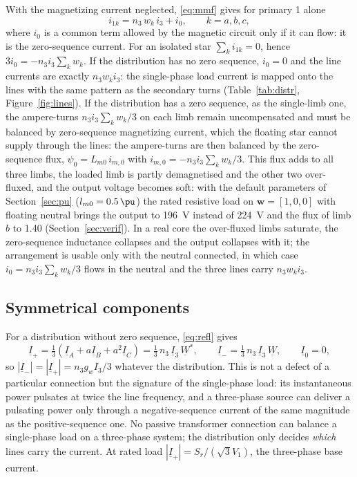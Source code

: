 \documentclass[10pt,a4paper]{scrartcl}
\newcommand{\ph}[1]{\underline{#1}}
\newcommand{\vect}[1]{\boldsymbol{#1}}
\begin{document}
\begin{onehalfspace}
With the magnetizing current neglected, \eqref{eq:mmf} gives for primary 1 alone
\begin{equation}
i_{1k} = n_3\,w_k\,i_3 + i_{0}, \qquad k=a,b,c ,
\label{eq:refl}
\end{equation}
where $i_0$ is a common term allowed by the magnetic circuit only if it can flow: it is the zero-sequence current. For an isolated star $\sum_k i_{1k}=0$, hence $3i_0 = -n_3 i_3\sum_k w_k$. If the distribution has no zero sequence, $i_0=0$ and the line currents are exactly $n_3 w_k i_3$: the single-phase load current is mapped onto the lines with the same pattern as the secondary turns (Table~\ref{tab:distr}, Figure~\ref{fig:lines}). If the distribution has a zero sequence, as the single-limb one, the ampere-turns $n_3 i_3 \sum_k w_k/3$ on each limb remain uncompensated and must be balanced by zero-sequence magnetizing current, which the floating star cannot supply through the lines: the ampere-turns are then balanced by the zero-sequence flux, $\psi_0 = L_{m0}\,i_{m,0}$ with $i_{m,0} = -n_3 i_3\sum_k w_k/3$. This flux adds to all three limbs, the loaded limb is partly demagnetised and the other two over-fluxed, and the output voltage becomes soft: with the default parameters of Section~\ref{sec:pu} ($l_{m0}=\SI{0.5}{\pu}$) the rated resistive load on $\vect{w}=[1,0,0]$ with floating neutral brings the output to \SI{196}{V} instead of \SI{224}{V} and the flux of limb $b$ to \SI{1.40}{\pu} (Section~\ref{sec:verif}). In a real core the over-fluxed limbs saturate, the zero-sequence inductance collapses and the output collapses with it; the arrangement is usable only with the neutral connected, in which case $i_0 = n_3 i_3\sum_k w_k/3$ flows in the neutral and the three lines carry $n_3 w_k i_3$.

\subsection{Symmetrical components}

For a distribution without zero sequence, \eqref{eq:refl} gives
\begin{equation}
\ph{I}_+ = \tfrac13\left(\ph{I}_A + a\ph{I}_B + a^2\ph{I}_C\right) = \tfrac13\,n_3\,\ph{I}_3\,\ph{W}^{*}, \qquad
\ph{I}_- = \tfrac13\,n_3\,\ph{I}_3\,\ph{W}, \qquad \ph{I}_0 = 0 ,
\label{eq:seq}
\end{equation}
so $|\ph{I}_-| = |\ph{I}_+| = n_3 g_w I_3/3$ whatever the distribution. This is not a defect of a particular connection but the signature of the single-phase load: its instantaneous power pulsates at twice the line frequency, and a three-phase source can deliver a pulsating power only through a negative-sequence current of the same magnitude as the positive-sequence one. No passive transformer connection can balance a single-phase load on a three-phase system; the distribution only decides \emph{which} lines carry the current. At rated load $|\ph{I}_+| = S_r/(\sqrt3 V_1)$, the three-phase base current.


\end{onehalfspace}
\end{document}
